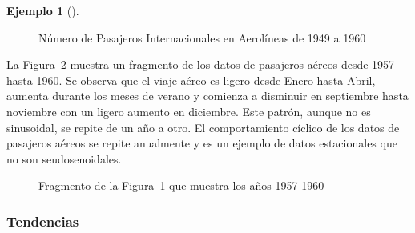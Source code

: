 \documentclass[
  us-letterpaper,
]{scrreprt}
\theoremstyle{definition}
\newtheorem{example}{Ejemplo}[chapter]
\theoremstyle{plain}
\theoremstyle{plain}
\theoremstyle{definition}
\theoremstyle{remark}
\begin{document}
\begin{example}[]
\begin{tcolorbox}
\begin{figure}[H]
{}

\caption{\label{fig-airpass}Número de Pasajeros Internacionales en
Aerolíneas de 1949 a 1960}

\end{figure}%

La Figura~\ref{fig-airfrag} muestra un fragmento de los datos de
pasajeros aéreos desde 1957 hasta 1960. Se observa que el viaje aéreo es
ligero desde Enero hasta Abril, aumenta durante los meses de verano y
comienza a disminuir en septiembre hasta noviembre con un ligero aumento
en diciembre. Este patrón, aunque no es sinusoidal, se repite de un año
a otro. El comportamiento cíclico de los datos de pasajeros aéreos se
repite anualmente y es un ejemplo de datos estacionales que no son
seudosenoidales.

\begin{figure}[H]


\caption{\label{fig-airfrag}Fragmento de la Figura~\ref{fig-airpass} que
muestra los años 1957-1960}

\end{figure}%

\end{tcolorbox}

\end{example}

\subsubsection{Tendencias}\label{sec-trend}
\end{document}
